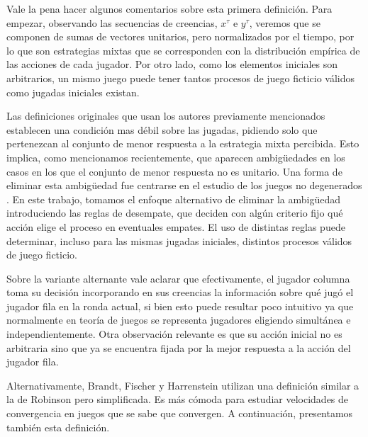 Vale la pena hacer algunos comentarios sobre esta primera definición. Para empezar, observando las secuencias de creencias, $x^\tau$ e $y^\tau$, veremos que se componen de sumas de vectores unitarios, pero normalizados por el tiempo, por lo que son estrategias mixtas que se corresponden con la distribución empírica de las acciones de cada jugador. Por otro lado, como los elementos iniciales son arbitrarios, un mismo juego puede tener tantos procesos de juego ficticio válidos como jugadas iniciales existan.

Las definiciones originales que usan los autores previamente mencionados establecen una condición mas débil sobre las jugadas, pidiendo solo que pertenezcan al conjunto de menor respuesta a la estrategia mixta percibida. Esto implica, como mencionamos recientemente, que aparecen ambigüedades en los casos en los que el conjunto de menor respuesta no es unitario. Una forma de eliminar esta ambigüedad fue centrarse en el estudio de los juegos no degenerados \cite{browns:original}. En este trabajo, tomamos el enfoque alternativo de eliminar la ambigüedad introduciendo las reglas de desempate, que deciden con algún criterio fijo qué acción elige el proceso en eventuales empates. El uso de distintas reglas puede determinar, incluso para las mismas jugadas iniciales, distintos procesos válidos de juego ficticio.

Sobre la variante alternante vale aclarar que efectivamente, el jugador columna toma su decisión incorporando en sus creencias la información sobre qué jugó el jugador fila en la ronda actual, si bien esto puede resultar poco intuitivo ya que normalmente en teoría de juegos se representa jugadores eligiendo simultánea e independientemente. Otra observación relevante es que su acción inicial no es arbitraria sino que ya se encuentra fijada por la mejor respuesta a la acción del jugador fila.

Alternativamente, Brandt, Fischer y Harrenstein \cite{brandt:rate:convergence} utilizan una definición similar a la de Robinson \cite{robinson:zerosum} pero simplificada. Es más cómoda para estudiar velocidades de convergencia en juegos que se sabe que convergen. A continuación, presentamos también esta definición.

